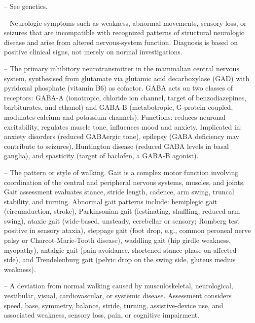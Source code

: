 -- See genetics.

-- Neurologic symptoms such as weakness, abnormal movements, sensory loss, or seizures that are incompatible with recognized patterns of structural neurologic disease and arise from altered nervous-system function. Diagnosis is based on positive clinical signs, not merely on normal investigations.

-- The primary inhibitory neurotransmitter in the mammalian central nervous system, synthesised from glutamate via glutamic acid decarboxylase (GAD) with pyridoxal phosphate (vitamin B6) as cofactor. GABA acts on two classes of receptors: GABA-A (ionotropic, chloride ion channel, target of benzodiazepines, barbiturates, and ethanol) and GABA-B (metabotropic, G-protein coupled, modulates calcium and potassium channels). Functions: reduces neuronal excitability, regulates muscle tone, influences mood and anxiety. Implicated in: anxiety disorders (reduced GABAergic tone), epilepsy (GABA deficiency may contribute to seizures), Huntington disease (reduced GABA levels in basal ganglia), and spasticity (target of baclofen, a GABA-B agonist).

-- The pattern or style of walking. Gait is a complex motor function involving coordination of the central and peripheral nervous systems, muscles, and joints. Gait assessment evaluates stance, stride length, cadence, arm swing, truncal stability, and turning. Abnormal gait patterns include: hemiplegic gait (circumduction, stroke), Parkinsonian gait (festinating, shuffling, reduced arm swing), ataxic gait (wide-based, unsteady, cerebellar or sensory; Romberg test positive in sensory ataxia), steppage gait (foot drop, e.g., common peroneal nerve palsy or Charcot-Marie-Tooth disease), waddling gait (hip girdle weakness, myopathy), antalgic gait (pain avoidance, shortened stance phase on affected side), and Trendelenburg gait (pelvic drop on the swing side, gluteus medius weakness).

-- A deviation from normal walking caused by musculoskeletal, neurological, vestibular, visual, cardiovascular, or systemic disease. Assessment considers speed, base, symmetry, balance, stride, turning, assistive-device use, and associated weakness, sensory loss, pain, or cognitive impairment.

